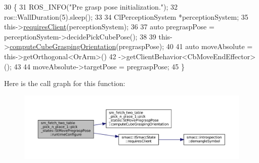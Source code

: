 \begin{DoxyCode}
30     \{
31         ROS\_INFO(\textcolor{stringliteral}{"Pre grasp pose initialization."});
32         ros::WallDuration(5).sleep();
33 
34         ClPerceptionSystem *perceptionSystem;
35         this->\hyperlink{classsmacc_1_1ISmaccState_a7f95c9f0a6ea2d6f18d1aec0519de4ac}{requiresClient}(perceptionSystem);
36         
37         \textcolor{keyword}{auto} pregraspPose = perceptionSystem->decidePickCubePose();
38 
39         this->\hyperlink{structsm__fetch__two__table__pick__n__place__1_1_1pick__states_1_1StMovePregraspPose_a832273127f1dfc2ccd0ab845ce00d6c4}{computeCubeGraspingOrientation}(pregraspPose);
40 
41         \textcolor{keyword}{auto} moveAbsolute = this->getOrthogonal<OrArm>()
42                                 ->getClientBehavior<CbMoveEndEffector>();
43 
44         moveAbsolute->targetPose = pregraspPose;
45     \}
\end{DoxyCode}
Here is the call graph for this function\+:
\nopagebreak
\begin{figure}[H]
\begin{center}
\leavevmode
\includegraphics[width=350pt]{structsm__fetch__two__table__pick__n__place__1_1_1pick__states_1_1StMovePregraspPose_a376e008e6555f25b8a2cbeaabf5bfd50_cgraph}
\end{center}
\end{figure}
\mbox{\label{structsm__fetch__two__table__pick__n__place__1_1_1pick__states_1_1StMovePregraspPose_a657f2fa91071cc8270e929b12ffe59d1}} 
